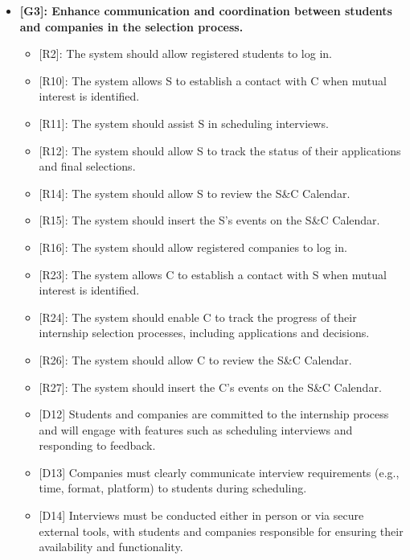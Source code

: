 \begin{itemize}
\item
  \textbf{{[}G3{]}: Enhance communication and coordination between
  students and companies in the selection process.}

  \begin{itemize}
  \item
    {[}R2{]}: The system should allow registered students to log in.
  \item
    {[}R10{]}: The system allows S to establish a contact with C when
    mutual interest is identified.
  \item
    {[}R11{]}: The system should assist S in scheduling interviews.
  \item
    {[}R12{]}: The system should allow S to track the status of their
    applications and final selections.
  \item
    {[}R14{]}: The system should allow S to review the S\&C Calendar.
  \item
    {[}R15{]}: The system should insert the S's events on the S\&C
    Calendar.
  \item
    {[}R16{]}: The system should allow registered companies to log in.
  \item
    {[}R23{]}: The system allows C to establish a contact with S when
    mutual interest is identified.
  \item
    {[}R24{]}: The system should enable C to track the progress of their
    internship selection processes, including applications and
    decisions.~
  \item
    {[}R26{]}: The system should allow C to review the S\&C Calendar.
  \item
    {[}R27{]}: The system should insert the C's events on the S\&C
    Calendar.
  \item
    {[}D12{]} Students and companies are committed to the internship
    process and will engage with features such as scheduling interviews
    and responding to feedback.
  \item
    {[}D13{]} Companies must clearly communicate interview requirements
    (e.g., time, format, platform) to students during scheduling.
  \item
    {[}D14{]} Interviews must be conducted either in person or via
    secure external tools, with students and companies responsible for
    ensuring their availability and functionality.
  \end{itemize}
\end{itemize}

